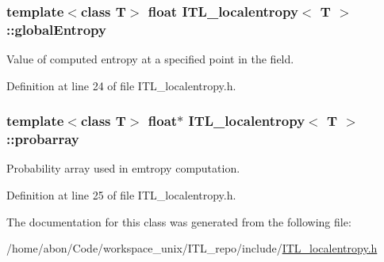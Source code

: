 \hypertarget{classITL__localentropy_a348b84e62aeb0982501bd586798432e3}{
\subsubsection[{globalEntropy}]{\setlength{\rightskip}{0pt plus 5cm}template$<$class T$>$ float {\bf ITL\_\-localentropy}$<$ T $>$::{\bf globalEntropy}}}
\label{classITL__localentropy_a348b84e62aeb0982501bd586798432e3}


Value of computed entropy at a specified point in the field. 



Definition at line 24 of file ITL\_\-localentropy.h.

\hypertarget{classITL__localentropy_ad5bf31b2310bf48330ac4b43f2f3c76b}{
\subsubsection[{probarray}]{\setlength{\rightskip}{0pt plus 5cm}template$<$class T$>$ float$\ast$ {\bf ITL\_\-localentropy}$<$ T $>$::{\bf probarray}}}
\label{classITL__localentropy_ad5bf31b2310bf48330ac4b43f2f3c76b}


Probability array used in emtropy computation. 



Definition at line 25 of file ITL\_\-localentropy.h.



The documentation for this class was generated from the following file:\begin{DoxyCompactItemize}
\item 
/home/abon/Code/workspace\_\-unix/ITL\_\-repo/include/\hyperlink{ITL__localentropy_8h}{ITL\_\-localentropy.h}\end{DoxyCompactItemize}
